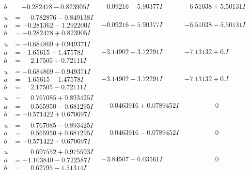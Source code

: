 \documentclass[1p]{elsarticle_modified}
\theoremstyle{definition}
\begin{document}
$$\begin{array}{c|c|c}
\begin{aligned}
b &= -0.282478 - 0.823905 I\end{aligned}
 & -0.09216 - 5.90377 I & -6.51038 + 5.50131 I \\ \hline\begin{aligned}
u &= \phantom{-}0.782876 - 0.849138 I \\
a &= -0.281362 - 1.292200 I \\
b &= -0.282478 + 0.823905 I\end{aligned}
 & -0.09216 + 5.90377 I & -6.51038 - 5.50131 I \\ \hline\begin{aligned}
u &= -0.684869 + 0.949371 I \\
a &= -1.65615 + 1.47578 I \\
b &= \phantom{-}2.17505 + 0.72111 I\end{aligned}
 & -3.14902 + 3.72291 I & -7.13132 + 0. I\phantom{ +0.000000I} \\ \hline\begin{aligned}
u &= -0.684869 - 0.949371 I \\
a &= -1.65615 - 1.47578 I \\
b &= \phantom{-}2.17505 - 0.72111 I\end{aligned}
 & -3.14902 - 3.72291 I & -7.13132 + 0. I\phantom{ +0.000000I} \\ \hline\begin{aligned}
u &= \phantom{-}0.767085 + 0.893425 I \\
a &= \phantom{-}0.565950 - 0.681295 I \\
b &= -0.571422 + 0.670697 I\end{aligned}
 & \phantom{-}0.0463916 + 0.0789452 I & \phantom{-0.000000 } 0 \\ \hline\begin{aligned}
u &= \phantom{-}0.767085 - 0.893425 I \\
a &= \phantom{-}0.565950 + 0.681295 I \\
b &= -0.571422 - 0.670697 I\end{aligned}
 & \phantom{-}0.0463916 - 0.0789452 I & \phantom{-0.000000 } 0 \\ \hline\begin{aligned}
u &= \phantom{-}0.697552 + 0.975593 I \\
a &= -1.103840 - 0.722587 I \\
b &= \phantom{-}0.62795 - 1.51314 I\end{aligned}
 & -3.84507 - 6.03561 I & \phantom{-0.000000 } 0 \\ \hline\begin{aligned}

\end{aligned}
\end{array}$$
\end{document}
